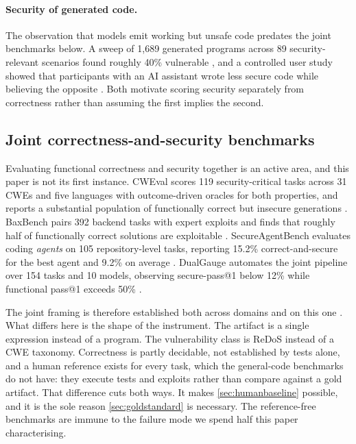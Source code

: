 \documentclass[11pt]{article}
\begin{document}
\paragraph{Security of generated code.}
The observation that models emit working but unsafe code predates the joint
benchmarks below. A sweep of 1{,}689 generated programs across 89
security-relevant scenarios found roughly 40\% vulnerable
\citep{pearce2022asleep}, and a controlled user study showed that
participants with an AI assistant wrote less secure code while believing the
opposite \citep{perry2023users}.
Both motivate scoring security separately from correctness rather than
assuming the first implies the second.

\subsection{Joint correctness-and-security benchmarks}
\label{sec:jointprior}

Evaluating functional correctness and security together is an active area, and
this paper is not its first instance. CWEval scores 119 security-critical
tasks across 31 CWEs and five languages with outcome-driven oracles for both
properties, and reports a substantial population of functionally correct but
insecure generations \citep{peng2025cweval}. BaxBench pairs 392 backend tasks
with expert exploits and finds that roughly half of functionally correct
solutions are exploitable \citep{vero2025baxbench}. SecureAgentBench evaluates
coding \emph{agents} on 105 repository-level tasks, reporting 15.2\%
correct-and-secure for the best agent and 9.2\% on average
\citep{chen2025secureagentbench}. DualGauge automates the joint pipeline over
154 tasks and 10 models, observing secure-pass@1 below 12\% while functional
pass@1 exceeds 50\% \citep{patir2025dualgauge}.

The joint framing is therefore established both across domains and on this
one \citep{siddiq2024regexeval}. What differs here is the shape of
the instrument. The artifact is a single expression instead of a program. The
vulnerability class is ReDoS instead of a CWE taxonomy. Correctness is partly
decidable, not established by tests alone, and a human reference exists for
every task, which the general-code benchmarks do not have: they execute tests
and exploits rather than compare against a gold artifact. That difference
cuts both ways. It makes \cref{sec:humanbaseline} possible, and it is the
sole reason \cref{sec:goldstandard} is necessary. The reference-free
benchmarks are immune to the failure mode we spend half this paper
characterising.
\end{document}
